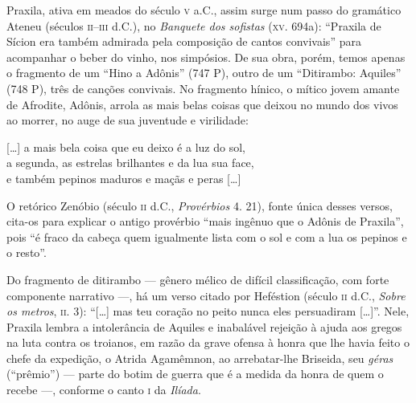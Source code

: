 Praxila, ativa em meados do século \textsc{v} a.C., assim surge num passo do gramático
Ateneu (séculos \textsc{ii}--\textsc{iii} d.C.), no \textit{Banquete dos sofistas} (\textsc{xv}. 694a):
``Praxila de Sícion era também admirada pela composição de cantos
convivais” para acompanhar o beber do vinho, nos simpósios. De sua obra,
porém, temos apenas o fragmento de um “Hino a Adônis” (747 P), outro
de um “Ditirambo: Aquiles” (748 P), três de canções convivais. No fragmento
hínico, o mítico jovem amante de Afrodite, Adônis, arrola as mais belas coisas
que deixou no mundo dos vivos ao morrer, no auge de sua juventude e virilidade:

\begin{hedraquote}
\mbox[\ldots{}] a mais bela coisa que eu deixo é a luz do sol,\\
a segunda, as estrelas brilhantes e da lua sua face,\\
e também pepinos maduros e maçãs e peras [\ldots{}]
\end{hedraquote}

O retórico Zenóbio (século \textsc{ii} d.C., \textit{Provérbios} 4. 21), fonte única
desses versos, cita-os para explicar o antigo provérbio ``mais ingênuo
que o Adônis de Praxila”, pois “é fraco da cabeça quem igualmente
lista com o sol e com a lua os pepinos e o resto”.

Do fragmento de ditirambo --- gênero mélico de difícil classificação, com forte
componente narrativo ---, há um verso citado por Heféstion (século \textsc{ii} d.C.,
\textit{Sobre os metros}, \textsc{ii}. 3): ``[\ldots{}] mas teu coração no peito nunca
eles persuadiram [\ldots{}]”. Nele, Praxila lembra a intolerância de Aquiles e
inabalável rejeição à ajuda aos gregos na luta contra os troianos, em razão da
grave ofensa à honra que lhe havia feito o chefe da expedição, o Atrida
Agamêmnon, ao arrebatar-lhe Briseida, seu \textit{géras} (“prêmio”) --- parte do
botim de guerra que é a medida da honra de quem o recebe ---, conforme o canto \textsc{i}
da \textit{Ilíada}.

